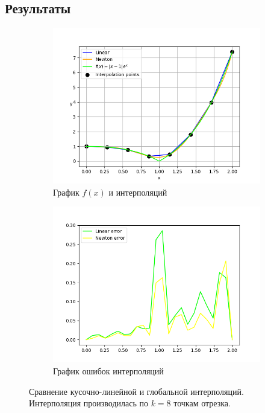 \documentclass[12pt]{article}%
\begin{document}
\subsection{Результаты}
\begin{figure}[!h]
\centering
\begin{subfigure}{0.49\textwidth}
    \includegraphics[width=\textwidth]{task3_intepolations.png}
    \caption{График $f(x)$ и интерполяций}
\end{subfigure}
\hfill
\begin{subfigure}{0.49\textwidth}
    \includegraphics[width=\textwidth]{task3_errors.png}
    \caption{График ошибок интерполяций}
\end{subfigure}

\caption{Сравнение кусочно-линейной и глобальной интерполяций. Интерполяция производилась по $k=8$ точкам отрезка.}
\end{figure}
\end{document}
